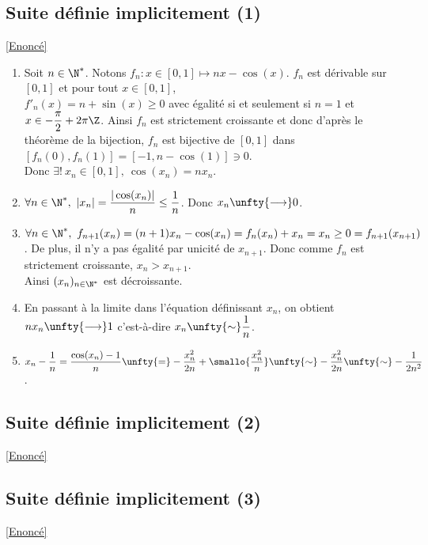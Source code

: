 \documentclass{book}
\begin{document}
	
	\subsection{Suite définie implicitement (1)}\label{sec:suite-definie-implicitement-1etoile2}
		\textcolor{blue}{\hyperref[Suite définie implicitment 1]{[Enoncé]}}\\
	\begin{enumerate}
		\item Soit $n\in \N^*$. Notons $f_n:x\in [0,1]\mapsto nx-\cos(x)$. $f_n$ est dérivable sur $[0,1]$ et pour tout $x\in [0,1]$,\\
		$f'_n(x)=n+\sin(x)\geq 0$ avec égalité si et seulement si $n=1$ et $x\in -\displaystyle\frac{\pi}{2} + 2\pi\Z$. Ainsi $f_n$ est strictement croissante et donc d'après le théorème de la bijection, $f_n$ est bijective de $[0,1]$ dans $[f_n(0),f_n(1)]=[-1,n-\cos(1)]\owns 0$.\\
		Donc $\exists!\ x_n\in [0,1],\ \cos(x_n)=nx_n$.
		\item $\forall n\in \N^*,\ |x_n|=\displaystyle\frac{|\cos(x_n)|}{n}\leq \displaystyle\frac{1}{n}$. Donc $x_n\unfty{\longrightarrow} 0$.
		\item $\forall n\in \N^*,\ f_{n+1}(x_n)=(n+1)x_n-\cos(x_n)=f_n(x_n)+x_n=x_n\geq 0=f_{n+1}(x_{n+1})$. De plus, il n'y a pas égalité par unicité de $x_{n+1}$. Donc comme $f_n$ est strictement croissante, $x_n>x_{n+1}$.\\
		Ainsi $(x_n)_{n\in \N^*}$ est décroissante.
		\item En passant à la limite dans l'équation définissant $x_n$, on obtient $nx_n\unfty{\longrightarrow} 1$ c'est-à-dire $x_n\unfty{\sim} \displaystyle\frac{1}{n}$.
		\item $x_n-\displaystyle\frac{1}{n}=\displaystyle\frac{\cos(x_n)-1}{n}\unfty{=}-\displaystyle\frac{x_n^2}{2n}+\smallo{\displaystyle\frac{x_n^2}{n}}\unfty{\sim}-\displaystyle\frac{x_n^2}{2n}\unfty{\sim}-\displaystyle\frac{1}{2n^2}$.
	\end{enumerate}
	
	\subsection{Suite définie implicitement (2)}\label{sec:suite-definie-implicitement-2}
		\textcolor{blue}{\hyperref[Suite définie implicitement 2]{[Enoncé]}}\\
	
	\subsection{Suite définie implicitement (3)}\label{sec:suite-definie-implicitement-3}
	\textcolor{blue}{\hyperref[Suite définie implicitement 3]{[Enoncé]}}\\	
	
\end{document}
